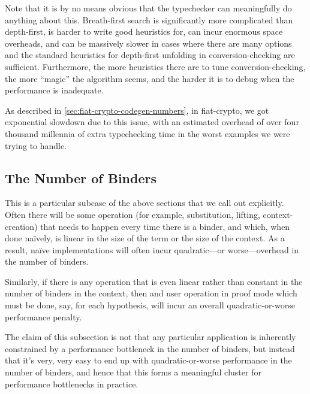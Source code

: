 Note that it is by no means obvious that the typechecker can meaningfully do anything about this.
Breath-first search is significantly more complicated than depth-first, is harder to write good heuristics for, can incur enormous space overheads, and can be massively slower in cases where there are many options and the standard heuristics for depth-first unfolding in conversion-checking are sufficient.
Furthermore, the more heuristics there are to tune conversion-checking, the more ``magic'' the algorithm seems, and the harder it is to debug when the performance is inadequate.

As described in \autoref{sec:fiat-crypto-codegen-numbers}, in fiat-crypto, we got exponential slowdown due to this issue, with an estimated overhead of over four thousand millennia of extra typechecking time in the worst examples we were trying to handle.


\subsection{The Number of Binders} \label{sec:perf:binder-count}

This is a particular subcase of the above sections that we call out explicitly.
Often there will be some operation (for example, substitution, lifting, context-creation) that needs to happen every time there is a binder, and which, when done naïvely, is linear in the size of the term or the size of the context.
As a result, naïve implementations will often incur quadratic---or worse---overhead in the number of binders.


Similarly, if there is any operation that is even linear rather than constant in the number of binders in the context, then and user operation in proof mode which must be done, say, for each hypothesis, will incur an overall quadratic-or-worse performance penalty.

The claim of this subsection is not that any particular application is inherently constrained by a performance bottleneck in the number of binders, but instead that it's very, very easy to end up with quadratic-or-worse performance in the number of binders, and hence that this forms a meaningful cluster for performance bottlenecks in practice.

